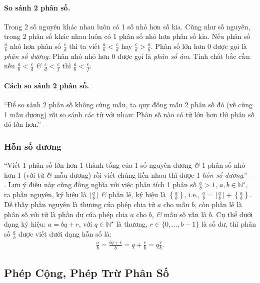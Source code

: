 \documentclass{article}
\numberwithin{equation}{section}
\begin{document}
\paragraph{So sánh 2 phân số.} Trong 2 số nguyên khác nhau luôn có 1 số nhỏ hơn số kia. Cũng như số nguyên, trong 2 phân số khác nhau luôn có 1 phân số nhỏ hơn phân số kia. Nếu phân số $\frac{a}{b}$ nhỏ hơn phân số $\frac{c}{d}$ thì ta viết $\frac{a}{b} < \frac{c}{d}$ hay $\frac{c}{d} > \frac{a}{b}$. Phân số lớn hơn 0 được gọi là \emph{phân số dương}. Phân nhỏ nhỏ hơn 0 được gọi là \emph{phân số âm}. Tính chất bắc cầu: nếu $\frac{a}{b} < \frac{c}{d}$ \textit{\&} $\frac{c}{d} < \frac{e}{f}$ thì $\frac{a}{b} < \frac{e}{f}$.

\paragraph{Cách so sánh 2 phân số.} ``Để so sánh 2 phân số không cùng mẫu, ta quy đồng mẫu 2 phân số đó (về cùng 1 mẫu dương) rồi so sánh các tử với nhau: Phân số nào có tử lớn hơn thì phân số đó lớn hơn.'' -- \cite[p. 31]{Thai_Anh_Dat_Ha_Loan_Nam_Quang_Toan_6_tap_1}

\subsubsection{Hỗn số dương}
``Viết 1 phân số lớn hơn 1 thành tổng của 1 số nguyên dương \textit{\&} 1 phân số nhỏ hơn 1 (với tử \textit{\&} mẫu dương) rồi viết chúng liền nhau thì được 1 \emph{hỗn số dương}.'' -- \cite[p. 32]{Thai_Anh_Dat_Ha_Loan_Nam_Quang_Toan_6_tap_2}. Lưu ý điều này cũng đồng nghĩa với việc phân tích 1 phân số $\frac{a}{b} > 1$, $a,b\in\mathbb{N}^\star$, ra phần nguyên, ký hiệu là $\lfloor\frac{a}{b}\rfloor$ \textit{\&} phần lẻ, ký hiệu là $\left\{\frac{a}{b}\right\}$, i.e., $\frac{a}{b} = \lfloor\frac{a}{b}\rfloor + \left\{\frac{a}{b}\right\}$. Dễ thấy phần nguyên là thương của phép chia tử $a$ cho mẫu $b$, còn phần lẻ là phân số với tử là phần dư của phép chia $a$ cho $b$, \textit{\&} mẫu số vẫn là $b$. Cụ thể dưới dạng ký hiệu: $a = bq + r$, với $q\in\mathbb{N}^\star$ là thương, $r\in\{0,\ldots,b - 1\}$ là số dư, thì phân số $\frac{a}{b}$ được viết dưới dạng hỗn số là:
\begin{align*}
	\frac{a}{b} = \frac{bq + r}{b} = q + \frac{r}{b} = q\frac{r}{b}.
\end{align*}

\subsection{Phép Cộng, Phép Trừ Phân Số}
\end{document}
